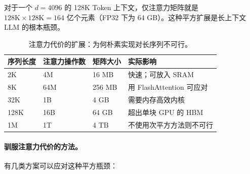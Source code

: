 对于一个 $d = 4096$ 的 128K Token 上下文，仅注意力矩阵就是 $128\text{K} \times 128\text{K} = 164$ 亿个元素（FP32 下为 64 GB）。这种平方扩展是长上下文 LLM 的根本瓶颈。

\vspace{6pt}
\begin{table}[ht!]
\centering
\caption{注意力代价的扩展：为何朴素实现对长序列不可行。}
\begin{tabular}{@{}llll@{}}
\toprule
\textbf{序列长度} & \textbf{注意力操作数} & \textbf{矩阵大小} & \textbf{实际影响} \\
\midrule
2K & 4M & 16 MB & 快速；可放入 SRAM \\
8K & 64M & 256 MB & 用 FlashAttention 可应对 \\
32K & 1B & 4 GB & 需要内存高效内核 \\
128K & 16B & 64 GB & 超出单块 GPU 的 HBM \\
1M & 1T & 4 TB & 不使用次平方方法则不可行 \\
\bottomrule
\end{tabular}
\end{table}

\paragraph{驯服注意力代价的方法。}
\label{approaches-to-taming-attention-cost.}

有几类方案可以应对这种平方瓶颈：

